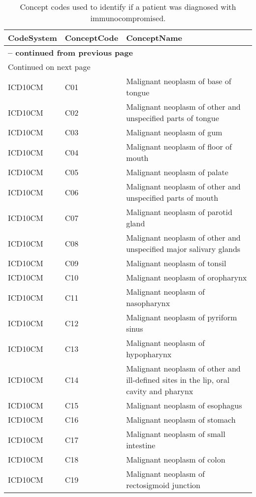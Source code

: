\begin{longtable}{p{}p{}p{}}
\caption{Concept codes used to identify if a patient was diagnosed with immunocompromised.} \\ 
 CodeSystem & ConceptCode & ConceptName \\ 
  \hline 
\endfirsthead 
\multicolumn{3}{p{\textwidth}}{{ \bfseries \tablename \thetable{} -- continued from previous page}} \ 
\hline CodeSystem & ConceptCode & ConceptName \\ \hline 
\endhead 
\hline \multicolumn{3}{p{\textwidth}}{{Continued on next page}} \\ \hline 
\endfoot 
\hline 
\endlastfoot 
 \hline
ICD10CM & C01 & Malignant neoplasm of base of tongue \\ 
  ICD10CM & C02 & Malignant neoplasm of other and unspecified parts of tongue \\ 
  ICD10CM & C03 & Malignant neoplasm of gum \\ 
  ICD10CM & C04 & Malignant neoplasm of floor of mouth \\ 
  ICD10CM & C05 & Malignant neoplasm of palate \\ 
  ICD10CM & C06 & Malignant neoplasm of other and unspecified parts of mouth \\ 
  ICD10CM & C07 & Malignant neoplasm of parotid gland \\ 
  ICD10CM & C08 & Malignant neoplasm of other and unspecified major salivary glands \\ 
  ICD10CM & C09 & Malignant neoplasm of tonsil \\ 
  ICD10CM & C10 & Malignant neoplasm of oropharynx \\ 
  ICD10CM & C11 & Malignant neoplasm of nasopharynx \\ 
  ICD10CM & C12 & Malignant neoplasm of pyriform sinus \\ 
  ICD10CM & C13 & Malignant neoplasm of hypopharynx \\ 
  ICD10CM & C14 & Malignant neoplasm of other and ill-defined sites in the lip, oral cavity and pharynx \\ 
  ICD10CM & C15 & Malignant neoplasm of esophagus \\ 
  ICD10CM & C16 & Malignant neoplasm of stomach \\ 
  ICD10CM & C17 & Malignant neoplasm of small intestine \\ 
  ICD10CM & C18 & Malignant neoplasm of colon \\ 
  ICD10CM & C19 & Malignant neoplasm of rectosigmoid junction \\ 

\end{longtable}
